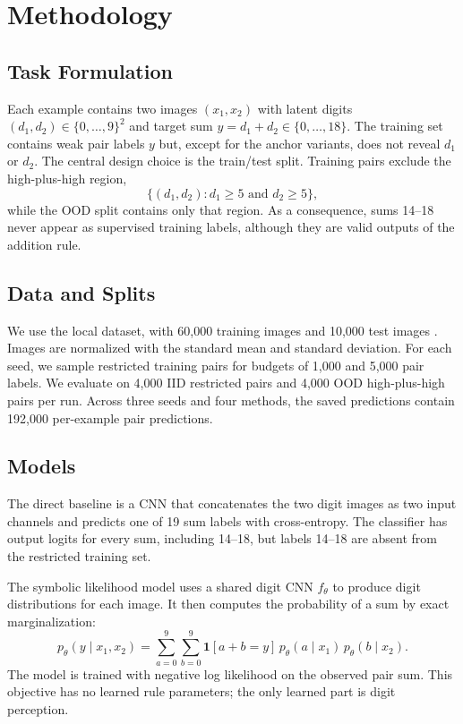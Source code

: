 \section{Methodology}
\label{sec:method}

\subsection{Task Formulation}

Each example contains two \mnist images $(x_1,x_2)$ with latent digits $(d_1,d_2)\in\{0,\ldots,9\}^2$ and target sum $y=d_1+d_2\in\{0,\ldots,18\}$. The training set contains weak pair labels $y$ but, except for the anchor variants, does not reveal $d_1$ or $d_2$. The central design choice is the train/test split. Training pairs exclude the high-plus-high region,
\begin{equation}
    \{(d_1,d_2): d_1 \geq 5 \text{ and } d_2 \geq 5\},
\end{equation}
while the OOD split contains only that region. As a consequence, sums 14--18 never appear as supervised training labels, although they are valid outputs of the addition rule.

\subsection{Data and Splits}

We use the local \mnist dataset, with 60,000 training images and 10,000 test images \cite{lecun1998gradient}. Images are normalized with the standard \mnist mean and standard deviation. For each seed, we sample restricted training pairs for budgets of 1,000 and 5,000 pair labels. We evaluate on 4,000 IID restricted pairs and 4,000 OOD high-plus-high pairs per run. Across three seeds and four methods, the saved predictions contain 192,000 per-example pair predictions.

\subsection{Models}

 The direct baseline is a CNN that concatenates the two digit images as two input channels and predicts one of 19 sum labels with cross-entropy. The classifier has output logits for every sum, including 14--18, but labels 14--18 are absent from the restricted training set.

 The symbolic likelihood model uses a shared digit CNN $f_\theta$ to produce digit distributions for each image. It then computes the probability of a sum by exact marginalization:
\begin{equation}
    p_\theta(y \mid x_1,x_2)
    =
    \sum_{a=0}^{9}\sum_{b=0}^{9}
    \mathbf{1}[a+b=y]\,
    p_\theta(a\mid x_1)\,
    p_\theta(b\mid x_2).
    \label{eq:symbolic_likelihood}
\end{equation}
The model is trained with negative log likelihood on the observed pair sum. This objective has no learned rule parameters; the only learned part is digit perception.

